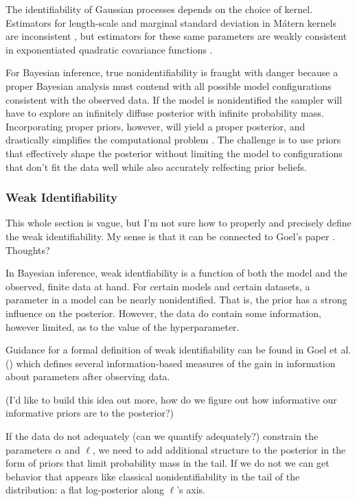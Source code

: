 \documentclass{article}
\begin{document}
The identifiability of Gaussian processes depends on the choice of kernel.
Estimators for length-scale and marginal standard deviation in M\'{a}tern
kernels are inconsistent \cite{zhang2004inconsistent}, but estimators for these
same parameters are weakly consistent in exponentiated quadratic covariance
functions \cite{abt1998fisher}. 

For Bayesian inference, true nonidentifiability is fraught with danger because
a proper Bayesian analysis must contend with all possible model configurations
consistent with the observed data. If the model is nonidentified the sampler
will have to explore an infinitely diffuse posterior with infinite
probability mass. Incorporating proper priors, however, will yield a proper
posterior, and drastically simplifies the computational problem
\cite{xie2004note}. The challenge is to use priors that effectively shape the
posterior without limiting the model to configurations that don't fit the data
well while also accurately relfecting prior beliefs. 

\subsubsection{Weak Identifiability}

This whole section is vague, but I'm not sure how to properly and precisely
define the weak identifiability. My sense is that it can be connected to 
Goel's paper \cite{goel1981information}. Thoughts?

In Bayesian inference, weak identfiability is a function of both the model and
the observed, finite data at hand. For certain models and certain datasets, a
parameter in a model can be nearly nonidentified. That is, the prior has a
strong influence on the posterior. However, the data do contain some
information, however limited, as to the value of the hyperparameter. 

Guidance for a formal definition of weak identifiability can be found in Goel
et al.  (\cite{goel1981information}) which defines several information-based
measures of the gain in information about parameters after observing data. 

(I'd like to build this idea out more, how do we figure out how informative our
 informative priors are to the posterior?)

If the data do not adequately (can we quantify adequately?) constrain the
parameters $\alpha$ and $\ell$, we need to add additional structure to the
posterior in the form of priors that limit probability mass in the tail. If we
do not we can get behavior that appears like classical nonidentifiability in
the tail of the distribution: a flat log-posterior along $\ell$'s axis. 
\end{document}
